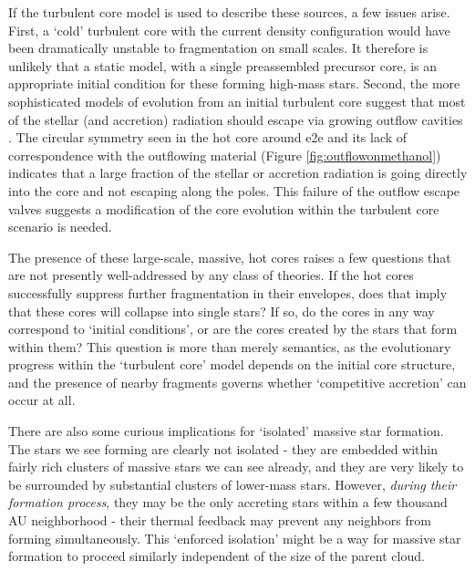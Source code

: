 \documentclass{emulateapj}
\begin{document}
If the turbulent core model is used to describe these sources, a few 
issues arise.  First, a `cold' turbulent core with the current density configuration
would have been dramatically unstable to fragmentation on small scales.  It
therefore is unlikely that a static model, with a single preassembled
precursor core, is an appropriate initial condition for these forming high-mass
stars.
Second, the more sophisticated models of evolution from an initial turbulent
core suggest that most of the stellar (and accretion) radiation should escape
via growing outflow cavities \citep{Zhang2011a,Zhang2013h,Zhang2014e}.  The
circular symmetry seen in the hot core around e2e and its lack of
correspondence with the outflowing material (Figure
\ref{fig:outflowonmethanol}) indicates that a large fraction of the stellar or
accretion radiation is going directly into the core and not escaping along the
poles.  This failure of the outflow escape valves suggests a modification of
the core evolution within the turbulent core scenario is needed.

The presence of these large-scale, massive, hot cores raises a few questions
that are not presently well-addressed by any class of theories.  If the hot
cores successfully suppress further fragmentation in their envelopes, does that
imply that these cores will collapse into single stars?  If so, do the cores in
any way correspond to `initial conditions', or are the cores created by the
stars that form within them?  This question is more than merely semantics,
as the evolutionary progress within the `turbulent core' model depends on the
initial core structure, and the presence of nearby fragments governs whether
`competitive accretion' can occur at all.

There are also some curious implications for `isolated' massive star formation.
The stars we see forming are clearly not isolated - they are embedded within
fairly rich clusters of massive stars we can see already, and they are very likely
to be surrounded by substantial clusters of lower-mass stars.  However, \emph{during
their formation process}, they may be the only accreting stars within a few thousand
AU neighborhood - their
thermal feedback may prevent any neighbors from forming simultaneously.  This
`enforced isolation' might be a way for massive star formation to proceed
similarly independent of the size of the parent cloud.
\end{document}
